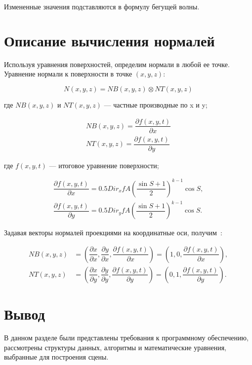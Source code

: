 Измененные значения подставляются в формулу бегущей волны.

\section{Описание вычисления нормалей}

Используя уравнения поверхностей, определим нормали в любой ее точке. 
Уравнение нормали к поверхности в точке $(x, y, z)$:

\begin{equation}
    N(x,y,z) = NB(x,y,z)\otimes NT(x,y,z)
\end{equation}
\begin{flushleft}
где $NB(x, y, z)$ и $NT(x, y, z)$ --- частные производные по x и y;    
\end{flushleft}

\begin{align}
    NB(x, y, z) = \dfrac{\partial f(x,y,t)}{\partial x} \\
    NT(x, y, z) = \dfrac{\partial f(x,y,t)}{\partial y}
\end{align}
\begin{flushleft}
где $f(x, y, t)$ --- итоговое уравнение поверхности;    
\end{flushleft}


\begin{align}
    \dfrac{\partial f(x,y,t)}{\partial x} = 0.5Dir_x f A\left(\dfrac{\sin{S} + 1}{2}\right)^{k-1}\cos{S}, \\
    \dfrac{\partial f(x,y,t)}{\partial y} = 0.5Dir_y f A\left(\dfrac{\sin{S} + 1}{2}\right)^{k-1}\cos{S}.
\end{align}


Задавая векторы нормалей проекциями на координатные оси, получим~\cite{WAVE}:

\begin{align}
    NB(x, y, z) &= \left(\dfrac{\partial x}{\partial x}, \dfrac{\partial y}{\partial x}, \dfrac{\partial f(x,y,t)}{\partial x}\right) = \left(1, 0, \dfrac{\partial f(x,y,t)}{\partial x}\right), \\
    NT(x, y, z) &= \left(\dfrac{\partial x}{\partial y}, \dfrac{\partial y}{\partial y}, \dfrac{\partial f(x,y,t)}{\partial y}\right) = \left(0, 1, \dfrac{\partial f(x,y,t)}{\partial y}\right).
\end{align}

\section*{Вывод}
В данном разделе были представлены требования к программному обеспечению, рассмотрены структуры данных, алгоритмы и математические уравнения, выбранные для построения сцены.
